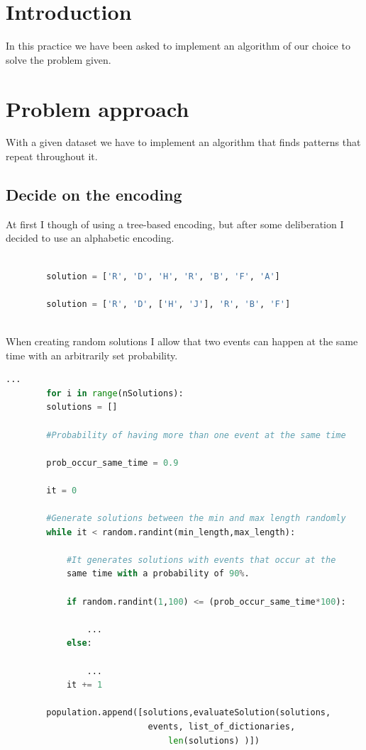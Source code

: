 \documentclass{article}
\begin{document}
    \newpage
    
    \section{Introduction}
    
    In this practice we have been asked to implement an algorithm of our choice to solve the problem given.

    \section{Problem approach}

    With a given dataset we have to implement an algorithm that finds patterns that repeat throughout it.

    \subsection{Decide on the encoding}

    At first I though of using a tree-based encoding, but after some deliberation I decided to use an alphabetic encoding.

    \begin{lstlisting}[language=Python]
        
        solution = ['R', 'D', 'H', 'R', 'B', 'F', 'A']
        
        solution = ['R', 'D', ['H', 'J'], 'R', 'B', 'F']
        
    \end{lstlisting}

    When creating random solutions I allow that two events can happen at the same time with an arbitrarily set probability. 

    \begin{lstlisting}[language=Python]
        ...
        for i in range(nSolutions):
        solutions = []
        
        #Probability of having more than one event at the same time

        prob_occur_same_time = 0.9

        it = 0

        #Generate solutions between the min and max length randomly
        while it < random.randint(min_length,max_length):
            
            #It generates solutions with events that occur at the 
            same time with a probability of 90%.

            if random.randint(1,100) <= (prob_occur_same_time*100):
                
                ...
            else:
               
                ...            
            it += 1

        population.append([solutions,evaluateSolution(solutions,
                            events, list_of_dictionaries, 
                                len(solutions) )])

    \end{lstlisting}
\end{document}

